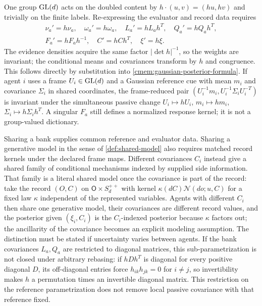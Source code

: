 One group $\mathrm{GL}(d)$ acts on the doubled content by $h\cdot(u,v)=(hu,hv)$ and trivially on the finite labels. Re-expressing the evaluator and record data requires
\begin{equation}
 \begin{gathered}
 \nu_a'=h\nu_a,\quad \omega_a'=h\omega_a,\quad
 L_a'=hL_ah^T,\quad Q_a'=hQ_ah^T,\\
 F_a'=hF_ah^{-1},\quad C'=hCh^T,\quad \xi'=h\xi.
 \end{gathered}
 \label{cmem:frame-laws}
\end{equation}
The evidence densities acquire the same factor $|\det h|^{-1}$, so the weights are invariant; the conditional means and covariances transform by $h$ and congruence. This follows directly by substitution into \cref{cmem:gaussian-posterior-formula}. If agent $i$ uses a frame $U_i\in\mathrm{GL}(d)$ and a Gaussian reference cue with mean $m_i$ and covariance $\Sigma_i$ in shared coordinates, the frame-reduced pair $(U_i^{-1}m_i,U_i^{-1}\Sigma_iU_i^{-T})$ is invariant under the simultaneous passive change $U_i\mapsto hU_i$, $m_i\mapsto hm_i$, $\Sigma_i\mapsto h\Sigma_ih^T$. A singular $F_a$ still defines a normalized response kernel; it is not a group-valued dictionary.

Sharing a bank supplies common reference and evaluator data. Sharing a generative model in the sense of \cref{def:shared-model} also requires matched record kernels under the declared frame maps. Different covariances $C_i$ instead give a shared family of conditional mechanisms indexed by supplied side information. That family is a literal shared model once the covariance is part of the record: take the record $(O,C)$ on $\mathsf O\times S^{++}_d$ with kernel $\kappa(dC)\mathcal N(do;u,C)$ for a fixed law $\kappa$ independent of the represented variables. Agents with different $C_i$ then share one generative model, their covariances are different record values, and the posterior given $(\xi_i,C_i)$ is the $C_i$-indexed posterior because $\kappa$ factors out; the ancillarity of the covariance becomes an explicit modeling assumption. The distinction must be stated if uncertainty varies between agents. If the bank covariances $L_a,Q_a$ are restricted to diagonal matrices, this sub-parametrization is not closed under arbitrary rebasing: if $hDh^T$ is diagonal for every positive diagonal $D$, its off-diagonal entries force $h_{ik}h_{jk}=0$ for $i\ne j$, so invertibility makes $h$ a permutation times an invertible diagonal matrix. This restriction on the reference parametrization does not remove local passive covariance with that reference fixed.

